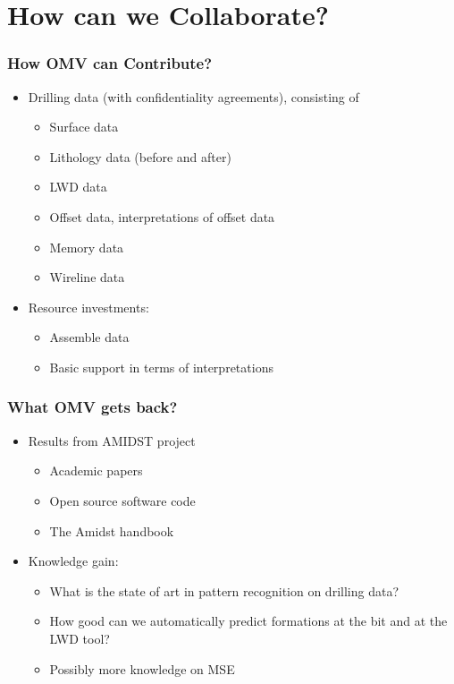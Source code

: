 \documentclass{beamer}
\begin{document}

\section{How can we Collaborate?}

\begin{frame} \frametitle{How OMV can Contribute?} 
\vspace{-1cm}

\begin{itemize}
\item<1-> Drilling data (with confidentiality agreements), consisting of
\begin{itemize}
\item<1-> Surface data
\item<1-> Lithology data (before and after)
\item<1-> LWD data
\item<1-> Offset data, interpretations of offset data
\item<2-> Memory data
\item<2-> Wireline data 
\end{itemize}
\item<3-> Resource investments:
\begin{itemize}
\item<3->  Assemble data
\item<3-> Basic support in terms of interpretations
\end{itemize}
\end{itemize}

\end{frame}

\begin{frame} \frametitle{What OMV gets back?} 
\vspace{-1cm}

\begin{itemize}
\item<1-> Results from AMIDST project
\begin{itemize}
\item<1-> Academic papers 
\item<1-> Open source software code
\item<1-> The Amidst handbook
\end{itemize}
\item<2-> Knowledge gain:
\begin{itemize}
\item<2-> What is the state of art in pattern recognition on drilling data?
\item<2-> How good can we automatically predict formations at the bit and at the LWD tool?
\item<2-> Possibly more knowledge on MSE
\end{itemize}
\end{itemize}

\end{frame}
\end{document}
